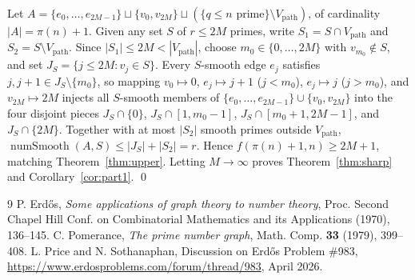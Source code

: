 \documentclass[11pt]{amsart}
\begin{document}
Let $A = \{e_0,\dots,e_{2M-1}\} \sqcup \{v_0, v_{2M}\} \sqcup (\{q \le n \text{ prime}\} \setminus V_{\mathrm{path}})$, of cardinality $|A| = \pi(n) + 1$. Given any set $S$ of $r \le 2M$ primes, write $S_1 = S \cap V_{\mathrm{path}}$ and $S_2 = S \setminus V_{\mathrm{path}}$. Since $|S_1| \le 2M < |V_{\mathrm{path}}|$, choose $m_0 \in \{0,\dots,2M\}$ with $v_{m_0} \notin S$, and set $J_S = \{j \le 2M : v_j \in S\}$. Every $S$-smooth edge $e_j$ satisfies $j, j+1 \in J_S \setminus \{m_0\}$, so mapping $v_0 \mapsto 0$, $e_j \mapsto j+1$ ($j < m_0$), $e_j \mapsto j$ ($j > m_0$), and $v_{2M} \mapsto 2M$ injects all $S$-smooth members of $\{e_0,\dots,e_{2M-1}\} \cup \{v_0, v_{2M}\}$ into the four disjoint pieces $J_S \cap \{0\}$, $J_S \cap [1, m_0-1]$, $J_S \cap [m_0+1, 2M-1]$, and $J_S \cap \{2M\}$. Together with at most $|S_2|$ smooth primes outside $V_{\mathrm{path}}$, $\operatorname{numSmooth}(A,S) \le |J_S| + |S_2| = r$. Hence $f(\pi(n)+1,n) \ge 2M+1$, matching Theorem~\ref{thm:upper}. Letting $M \to \infty$ proves Theorem~\ref{thm:sharp} and Corollary~\ref{cor:part1}. \qed

\begin{thebibliography}{9}
 P. Erd\H{o}s, \emph{Some applications of graph theory to number theory}, Proc. Second Chapel Hill Conf. on Combinatorial Mathematics and its Applications (1970), 136--145.
 C. Pomerance, \emph{The prime number graph}, Math. Comp. \textbf{33} (1979), 399--408.
 L. Price and N. Sothanaphan, Discussion on Erd\H{o}s Problem \#983, \url{https://www.erdosproblems.com/forum/thread/983}, April 2026.
\end{thebibliography}
\end{document}
